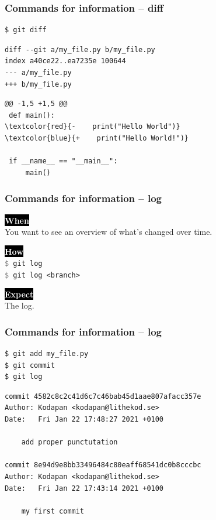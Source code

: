 \documentclass{beamer}
\newcommand{\keyword}[1]{\hspace{-1.0em}\colorbox{black}{\textcolor{white}{\textbf{#1}\vphantom{Ep}}}\vspace{0.2em}} %
\newcommand{\command}[1]{\texttt{\textcolor{gray}{\$} {#1}}}
\begin{document}
\begin{frame}[fragile]
  \frametitle{Commands for information -- diff}

\begin{verbatim}
$ git diff
\end{verbatim}
\pause{}
\vspace{-2.4ex}
{
\color{gray}
\begin{Verbatim}[commandchars=\\\{\}]
diff --git a/my_file.py b/my_file.py
index a40ce22..ea7235e 100644
--- a/my_file.py
+++ b/my_file.py
\end{Verbatim}
}
\pause{}
\begin{Verbatim}[commandchars=\\\{\}]
@@ -1,5 +1,5 @@
 def main():
\textcolor{red}{-    print("Hello World")}
\textcolor{blue}{+    print("Hello World!")}
 
 if __name__ == "__main__":
     main()
\end{Verbatim}
\end{frame}

\begin{frame}
  \frametitle{Commands for information -- log}

  \keyword{When}\\
  You want to see an overview of what's changed over time.
  \vspace{0.5em}

  \keyword{How}\\
  \command{git log} \\
  \command{git log <branch>}
  \vspace{0.5em}

  \keyword{Expect}\\
  The log.
\end{frame}

\begin{frame}[fragile]
  \frametitle{Commands for information -- log}
\begin{Verbatim}
$ git add my_file.py
$ git commit
$ git log
\end{Verbatim}
\pause{}
\vspace{-1.2ex} %
\begin{Verbatim}
commit 4582c8c2c41d6c7c46bab45d1aae807afacc357e
Author: Kodapan <kodapan@lithekod.se>
Date:   Fri Jan 22 17:48:27 2021 +0100

    add proper punctutation

commit 8e94d9e8bb33496484c80eaff68541dc0b8cccbc
Author: Kodapan <kodapan@lithekod.se>
Date:   Fri Jan 22 17:43:14 2021 +0100

    my first commit
\end{Verbatim}
\end{frame}
\end{document}
